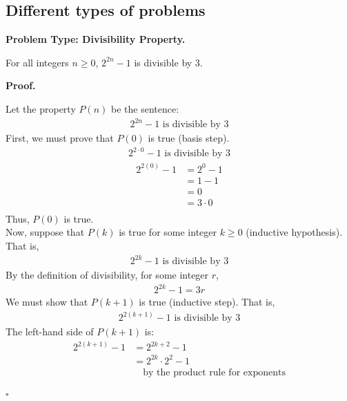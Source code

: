 \documentclass{article}
\newenvironment{problem}[1]{
    \begin{mdframed}[backgroundcolor=gray!20, skipabove=\baselineskip, skipbelow=\baselineskip, nobreak=true, innerleftmargin=10pt, innerrightmargin=10pt, innertopmargin=10pt, innerbottommargin=10pt]
    \textbf{Problem #1.}
}{
    \end{mdframed}
}
\newenvironment{proof}{
    \begin{mdframed}[nobreak=true, innerleftmargin=10pt, innerrightmargin=10pt, innertopmargin=10pt, innerbottommargin=10pt]
    \textbf{Proof.}
}{
    \hfill $\square$
    \end{mdframed}
}
\begin{document}
    \subsection{Different types of problems}
        \begin{problem}{Type: Divisibility Property}
            For all integers $n \geq 0$, $2^{2n} - 1$ is divisible by $3$.
        \end{problem}
        \begin{proof}
            Let the property $P(n)$ be the sentence:
            \begin{align*}
                2^{2n} - 1 \text{ is divisible by } 3
            \end{align*}
            First, we must prove that $P(0)$ is true (basis step).
            \begin{align*}
                2^{2 \cdot 0} - 1 \text{ is divisible by } 3
            \end{align*}
            \begin{align*}
                2^{2(0)} - 1 &= 2^0 - 1 \\
                &= 1 - 1 \\
                &= 0 \\
                &= 3 \cdot 0 \\
            \end{align*}
            Thus, $P(0)$ is true. \\
            Now, suppose that $P(k)$ is true for some integer $k \geq 0$ (inductive hypothesis). That is,
            \begin{align*}
                2^{2k} - 1 \text{ is divisible by } 3
            \end{align*}
            By the definition of divisibility, for some integer $r$,
            \begin{align*}
                2^{2k} - 1 = 3r
            \end{align*}
            We must show that $P(k+1)$ is true (inductive step). That is,
            \begin{align*}
                2^{2(k+1)} - 1 \text{ is divisible by } 3
            \end{align*}
            The left-hand side of $P(k+1)$ is:
            \begin{align*}
                2^{2(k+1)} - 1 &= 2^{2k+2} - 1 \\
                &= 2^{2k} \cdot 2^2 - 1 \\
                & \quad \text{by the product rule for exponents} \\

\end{align*}
\end{proof}
\end{document}
